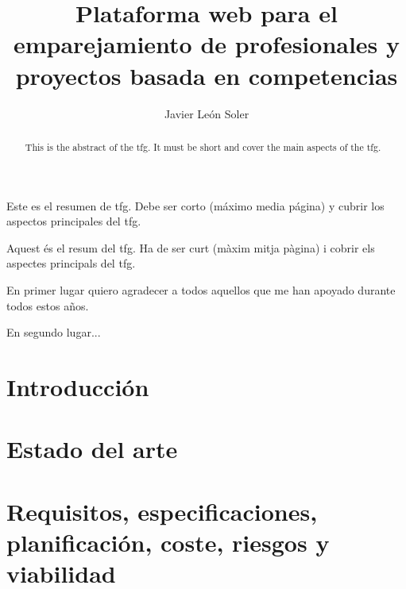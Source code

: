\documentclass[twoside,spanish,a4paper,12pt]{tfg}
\title{Plataforma web para el emparejamiento de profesionales y proyectos basada en competencias}
\author{Javier León Soler}
\begin{document}
\portada
\cleardoublepage
\contraportada
\cleardoublepage
\declaracion
\cleardoublepage


\begin{resumen}
  Este es el resumen de \gls{tfg}. Debe ser corto (máximo media página) y cubrir los aspectos principales del \gls{tfg}.
\end{resumen}
\cleardoublepage

\begin{abstract}
  This is the abstract of the \gls{tfg}. It must be short and cover the main aspects of the \gls{tfg}.
\end{abstract}
\cleardoublepage

\begin{resum}
  Aquest és el resum del \gls{tfg}. Ha de ser curt (màxim mitja pàgina) i cobrir els aspectes principals del \gls{tfg}.
\end{resum}
\cleardoublepage


\begin{agradecimientos}
  En primer lugar quiero agradecer a todos aquellos que me han apoyado durante todos estos años.

  En segundo lugar...
\end{agradecimientos}
\cleardoublepage



\tableofcontents
\cleardoublepage
\listoffigures
\cleardoublepage
\listoftables
\cleardoublepage
\lstlistoflistings


\pagestyle{tfg}
\justify



\chapter{Introducción}


\chapter{Estado del arte}\label{ch:estado-arte}


\chapter{Requisitos, especificaciones, planificación, coste, riesgos y viabilidad}\label{ch:requisitos}

\end{document}
